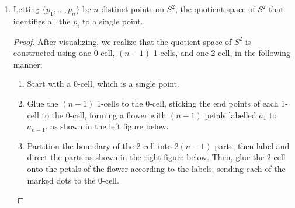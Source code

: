 \documentclass{article}
\begin{document}
\begin{enumerate}
\begin{enumerate}
\begin{proof}
          From construction, we summarize that an $n$-torus is built from
          $\binom{n}{i}$ $i$-cells, for $0\leq i\leq n$. \\
        \end{proof}

      \item Letting $\{p_1,\ldots,p_n\}$ be $n$ distinct points on $S^2$,
        the quotient space of $S^2$ that identifies all the $p_i$ to a
        single point.

        \begin{proof}
          After visualizing, we realize that the quotient space of
          $S^2$ is constructed using one 0-cell, $(n-1)$ 1-cells, and one
          2-cell, in the following manner:
          \begin{enumerate}
            \item Start with a 0-cell, which is a single point.
            \item Glue the $(n-1)$ 1-cells to the 0-cell, sticking the end
              points of each 1-cell to the 0-cell, forming a flower with
              $(n-1)$ petals labelled $a_1$ to $a_{n-1}$, as shown in the
              left figure below.
            \item Partition the boundary of the 2-cell into $2(n-1)$ parts,
              then label and direct the parts as shown in the right figure
              below. Then, glue the 2-cell onto the petals of the flower
              according to the labels, sending each of the marked dots to
              the 0-cell.
          \end{enumerate}

          \begin{center}
\end{center}
\end{proof}
\end{enumerate}
\end{enumerate}
\end{document}

